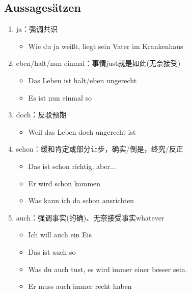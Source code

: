 \documentclass[UTF8]{report}
\begin{document}
\subsection{Aussagesätzen}
\begin{enumerate}
    \item ja：强调共识
    \begin{itemize}
        \item Wie du ja weißt, liegt sein Vater im Krankenhaus
    \end{itemize}
    \item eben/halt/nun einmal：事情just就是如此(无奈接受)
    \begin{itemize}
        \item Das Leben ist halt/eben ungerecht
        \item Es ist nun einmal so
    \end{itemize}
    \item doch：反驳预期
    \begin{itemize}
        \item Weil das Leben doch ungerecht ist
    \end{itemize}
    \item schon：缓和肯定或部分让步，确实/倒是，终究/反正
    \begin{itemize}
        \item Das ist schon richtig, aber...
        \item Er wird schon kommen
        \item Was kann ich da schon ausrichten
    \end{itemize}
    \item auch：强调事实(的确)、无奈接受事实whatever
    \begin{itemize}
        \item Ich will auch ein Eis
        \item Das ist auch so
        \item Was du auch tust, es wird immer einer besser sein.
        \item Er muss auch immer recht haben
    \end{itemize}
\end{enumerate}
\end{document}

